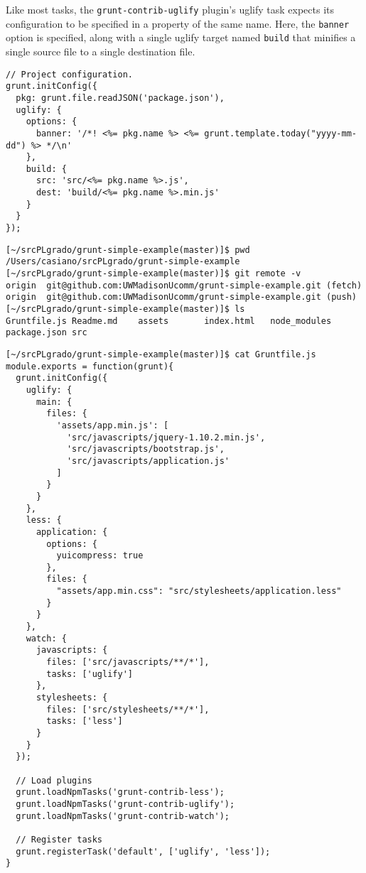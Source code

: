 Like most tasks, the 
\verb|grunt-contrib-uglify| plugin's uglify task expects its configuration 
to be specified in a property of the same name. 
Here, the \verb|banner| option is specified, along with a single uglify target 
named \verb|build| that minifies a single source file to a single destination file.

\begin{verbatim}
// Project configuration.
grunt.initConfig({
  pkg: grunt.file.readJSON('package.json'),
  uglify: {
    options: {
      banner: '/*! <%= pkg.name %> <%= grunt.template.today("yyyy-mm-dd") %> */\n'
    },
    build: {
      src: 'src/<%= pkg.name %>.js',
      dest: 'build/<%= pkg.name %>.min.js'
    }
  }
});
\end{verbatim}



\begin{verbatim}
[~/srcPLgrado/grunt-simple-example(master)]$ pwd
/Users/casiano/srcPLgrado/grunt-simple-example
[~/srcPLgrado/grunt-simple-example(master)]$ git remote -v
origin  git@github.com:UWMadisonUcomm/grunt-simple-example.git (fetch)
origin  git@github.com:UWMadisonUcomm/grunt-simple-example.git (push)
[~/srcPLgrado/grunt-simple-example(master)]$ ls
Gruntfile.js Readme.md    assets       index.html   node_modules package.json src
\end{verbatim}

\begin{verbatim}
[~/srcPLgrado/grunt-simple-example(master)]$ cat Gruntfile.js 
module.exports = function(grunt){
  grunt.initConfig({
    uglify: {
      main: {
        files: {
          'assets/app.min.js': [
            'src/javascripts/jquery-1.10.2.min.js',
            'src/javascripts/bootstrap.js',
            'src/javascripts/application.js'
          ]
        }
      }
    },
    less: {
      application: {
        options: {
          yuicompress: true
        },
        files: {
          "assets/app.min.css": "src/stylesheets/application.less"
        }
      }
    },
    watch: {
      javascripts: {
        files: ['src/javascripts/**/*'],
        tasks: ['uglify']
      },
      stylesheets: {
        files: ['src/stylesheets/**/*'],
        tasks: ['less']
      }
    }
  });

  // Load plugins
  grunt.loadNpmTasks('grunt-contrib-less');
  grunt.loadNpmTasks('grunt-contrib-uglify');
  grunt.loadNpmTasks('grunt-contrib-watch');

  // Register tasks
  grunt.registerTask('default', ['uglify', 'less']);
}
\end{verbatim}

